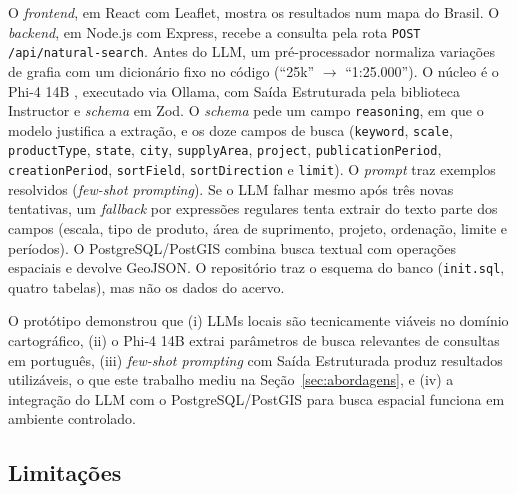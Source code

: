 O \textit{frontend}, em React com Leaflet, mostra os resultados num mapa do Brasil. O \textit{backend}, em Node.js com Express, recebe a consulta pela rota \texttt{POST /api/natural-search}. Antes do LLM, um pré-processador normaliza variações de grafia com um dicionário fixo no código (``25k'' $\rightarrow$ ``1:25.000''). O núcleo é o Phi-4 14B \cite{abdin2024phi4}, executado via Ollama, com Saída Estruturada pela biblioteca Instructor e \textit{schema} em Zod. O \textit{schema} pede um campo \texttt{reasoning}, em que o modelo justifica a extração, e os doze campos de busca (\texttt{keyword}, \texttt{scale}, \texttt{productType}, \texttt{state}, \texttt{city}, \texttt{supplyArea}, \texttt{project}, \texttt{publicationPeriod}, \texttt{creationPeriod}, \texttt{sortField}, \texttt{sortDirection} e \texttt{limit}). O \textit{prompt} traz exemplos resolvidos (\textit{few-shot prompting}). Se o LLM falhar mesmo após três novas tentativas, um \textit{fallback} por expressões regulares tenta extrair do texto parte dos campos (escala, tipo de produto, área de suprimento, projeto, ordenação, limite e períodos). O PostgreSQL/PostGIS combina busca textual com operações espaciais e devolve GeoJSON. O repositório traz o esquema do banco (\texttt{init.sql}, quatro tabelas), mas não os dados do acervo.

O protótipo demonstrou que (i) LLMs locais são tecnicamente viáveis no domínio cartográfico, (ii) o Phi-4 14B extrai parâmetros de busca relevantes de consultas em português, (iii) \textit{few-shot prompting} com Saída Estruturada produz resultados utilizáveis, o que este trabalho mediu na Seção~\ref{sec:abordagens}, e (iv) a integração do LLM com o PostgreSQL/PostGIS para busca espacial funciona em ambiente controlado.

\subsection{Limitações}
\label{sec:limitacoes}

